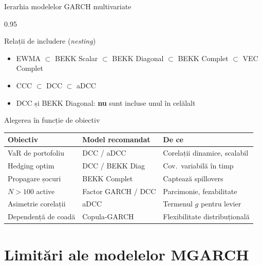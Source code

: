 \documentclass[9pt, aspectratio=169, t]{beamer}
\begin{document}
\begin{frame}{Ierarhia modelelor GARCH multivariate}
    \begin{cminipage}{0.95\textwidth}
    {\footnotesize
    \begin{block}{Relații de includere (\textit{nesting})}
        \begin{itemize}\setlength{\itemsep}{0pt}
            \item EWMA $\subset$ BEKK Scalar $\subset$ BEKK Diagonal $\subset$ BEKK Complet $\subset$ VEC Complet
            \item CCC $\subset$ DCC $\subset$ aDCC
            \item DCC și BEKK Diagonal: \textbf{nu} sunt incluse unul în celălalt
        \end{itemize}
    \end{block}
    \begin{block}{Alegerea în funcție de obiectiv}
        \vspace{0.1cm}
        \begin{center}
        {\scriptsize
        \begin{tabular}{lll}
            \hline
            \textbf{Obiectiv} & \textbf{Model recomandat} & \textbf{De ce} \\
            \hline
            VaR de portofoliu & DCC / aDCC & Corelații dinamice, scalabil \\
            Hedging optim & DCC / BEKK Diag & Cov.\ variabilă în timp \\
            Propagare șocuri & BEKK Complet & Captează spillovers \\
            $N > 100$ active & Factor GARCH / DCC & Parcimonie, fezabilitate \\
            Asimetrie corelații & aDCC & Termenul $g$ pentru levier \\
            Dependență de coadă & Copula-GARCH & Flexibilitate distribuțională \\
            \hline
        \end{tabular}
        }
        \end{center}
    \end{block}
    }
    \end{cminipage}
\end{frame}

\section{Limitări ale modelelor MGARCH}
\end{document}
